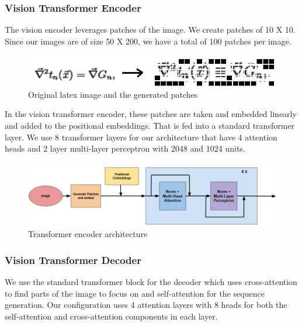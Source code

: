\documentclass{article}
\begin{document}
\subsubsection{Vision Transformer Encoder}
The vision encoder leverages patches of the image. We create patches of 10 X 10. Since our images are of size 50 X 200, we have a total of 100 patches per image.
\begin{figure}[h]
	\centering \includegraphics[scale=0.5]{image_to_patches.png}
	\caption{Original latex image and the generated patches}
\end{figure}

In the vision transformer encoder, these patches are taken and embedded linearly and added to the positional embeddings. That is fed into a standard transformer layer. We use 8 transformer layers for our architecture that have 4 attention heads and 2 layer multi-layer perceptron with 2048 and 1024 units.

\begin{figure}[H]
	\centering \includegraphics[scale=0.75]{transformer_encoder.png}
	\caption{Transformer encoder architecture}
\end{figure}

\subsubsection{Vision Transformer Decoder}

We use the standard transformer block for the decoder which uses cross-attention to find parts of the image to focus on and self-attention for the sequence generation. Our configuration uses 4 attention layers with 8 heads for both the self-attention and cross-attention components in each layer.
\end{document}
